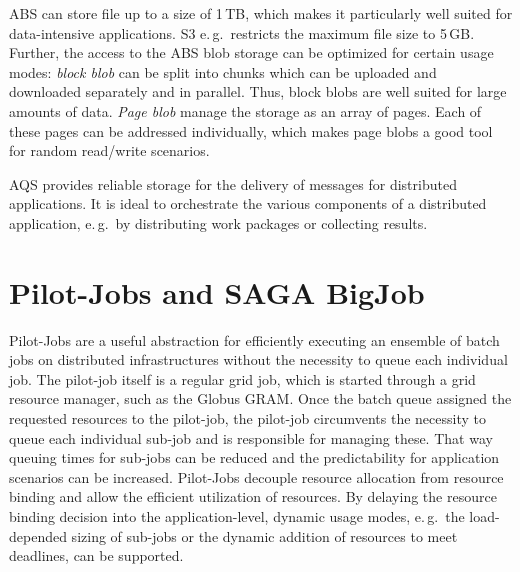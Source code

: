 \documentclass[conference,final]{IEEEtran}
\newcommand{\up}{\vspace*{-1em}}
\newcommand{\alnote}[1]{ {\textcolor{blue} { ***AL: #1 }}}
\newcommand{\jhanote}[1]{ {\textcolor{red} { ***SJ: #1 }}}
\newcommand{\alnote}[1]{}
\newcommand{\jhanote}[1]{}
\begin{document}
ABS can store file up to a size of 1\,TB, which makes it particularly
well suited for data-intensive applications. S3 e.\,g.\ restricts the
maximum file size to 5\,GB. Further, the access to the ABS blob
storage can be optimized for certain usage modes: \emph{block blob}
can be split into chunks which can be uploaded and downloaded
separately and in parallel.  Thus, block blobs are well suited for
large amounts of data. \emph{Page blob} manage the storage as an array
of pages. Each of these pages can be addressed individually, which
makes page blobs a good tool for random read/write scenarios.


AQS provides reliable storage for the delivery of messages for
distributed applications.  It is ideal to orchestrate the various
components of a distributed application, e.\,g.\ by distributing work
packages or collecting results.


\up
\section{Pilot-Jobs and SAGA BigJob}
\label{sec:pilot-bj}
\up

Pilot-Jobs are a useful abstraction for efficiently executing an
ensemble of batch jobs on distributed infrastructures without 
the necessity to queue each individual
job.  The pilot-job itself is a regular grid job, which is started
through a grid resource manager, such as the Globus GRAM.  Once the
batch queue assigned the requested resources to the pilot-job, the
pilot-job circumvents the necessity to queue each individual sub-job
and is responsible for managing these. 
That way queuing times for sub-jobs can be reduced and the
predictability for application scenarios can be increased.  Pilot-Jobs
decouple resource allocation from resource binding and allow the
efficient utilization of resources. By delaying the resource binding
decision into the application-level, dynamic usage modes, e.\,g.\ the
load-depended sizing of sub-jobs or the dynamic addition of resources
to meet deadlines, can be supported.
\end{document}
